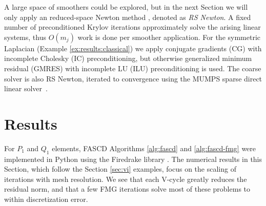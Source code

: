 \documentclass[review,hidelinks,onefignum,onetabnum,final]{siamart220329}  %
\begin{document}
A large space of smoothers could be explored, but in the next Section we will only apply an reduced-space Newton method \cite{Balayetal2023,BensonMunson2006}, denoted as \emph{RS Newton}.  A fixed number of preconditioned Krylov iterations approximately solve the arising linear systems, thus $O(m_j)$ work is done per smoother application.  For the symmetric Laplacian (Example \ref{ex:results:classical}) we apply conjugate gradients (CG) with incomplete Cholesky (IC) preconditioning, but otherwise generalized minimum residual (GMRES) with incomplete LU (ILU) preconditioning is used.  The coarse solver is also RS Newton, iterated to convergence using the MUMPS sparse direct linear solver~\cite{Amestoy2001}.


\section{Results} \label{sec:results}

For $P_1$ and $Q_1$ elements, FASCD Algorithms \ref{alg:fascd} and \ref{alg:fascd-fmg} were implemented in Python using the Firedrake library \cite{Rathgeberetal2016}.  The numerical results in this Section, which follow the Section \ref{sec:vi} examples, focus on the scaling of iterations with mesh resolution.  We see that each V-cycle greatly reduces the residual norm, and that a few FMG iterations solve most of these problems to within discretization error.
\end{document}
